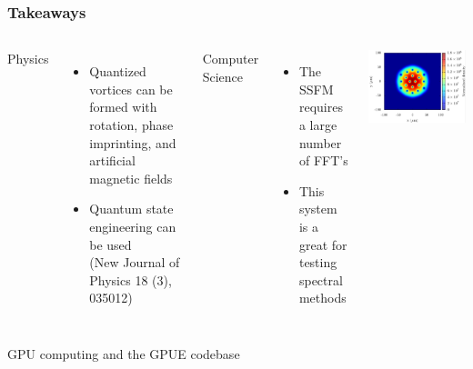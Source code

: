 \documentclass{beamer}
\begin{document}
\begin{frame}
\frametitle{Takeaways}
\begin{columns}
\hspace{0.25cm} 
Physics
\begin{itemize}
\item Quantized vortices can be formed with rotation, phase imprinting, and artificial magnetic fields
\item Quantum state engineering can be used \\
\small{(New Journal of Physics 18 (3), 035012)}
\end{itemize}

Computer Science
\begin{itemize}
\item The SSFM requires a large number of FFT's
\item This system is a great for testing spectral methods
\end{itemize}
\hspace{-0.3cm} 
 \includegraphics[width=1\textwidth]{../data/splitop/rot/density_L10.pdf}
\end{columns}

\end{frame}

\begin{frame}
\center \huge GPU computing and the GPUE codebase
\end{frame}
\end{document}
